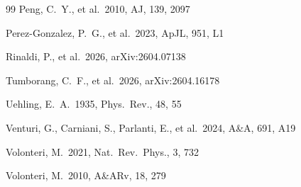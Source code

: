 \documentclass[apj,twocolumn,longbibliography,linenumbers]{aastex701}
\begin{document}
\begin{thebibliography}{99}
Peng, C.\ Y., et al.\ 2010, AJ, 139, 2097

Perez-Gonzalez, P.\ G., et al.\ 2023, ApJL, 951, L1

Rinaldi, P., et al.\ 2026, arXiv:2604.07138

Tumborang, C.\ F., et al.\ 2026, arXiv:2604.16178

Uehling, E.\ A.\ 1935, Phys.\ Rev., 48, 55

Venturi, G., Carniani, S., Parlanti, E., et al.\ 2024, A\&A, 691, A19

Volonteri, M.\ 2021, Nat.\ Rev.\ Phys., 3, 732

Volonteri, M.\ 2010, A\&ARv, 18, 279

\end{thebibliography}
\end{document}
